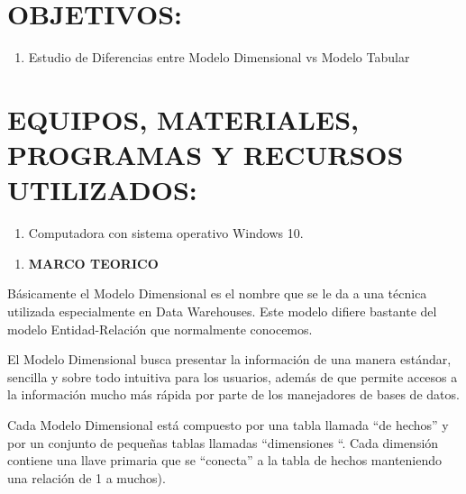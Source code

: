 \documentclass{article} %
\begin{document}
\noindent 

\noindent 
\section{OBJETIVOS:}

\noindent 

\begin{enumerate}
\item  Estudio de Diferencias entre Modelo Dimensional vs Modelo Tabular
\end{enumerate}

\noindent 

\noindent 
\section{EQUIPOS, MATERIALES, PROGRAMAS Y RECURSOS UTILIZADOS:}

\noindent 

\begin{enumerate}
\item  Computadora con sistema operativo Windows 10. 
\end{enumerate}

\noindent 

\begin{enumerate}
\item  \textbf{MARCO TEORICO}
\end{enumerate}

\noindent 

\noindent \textbf{}

\noindent \textbf{\underbar{}}

\noindent B\'{a}sicamente el Modelo Dimensional es el nombre que se le da a una t\'{e}cnica utilizada especialmente en Data Warehouses. Este modelo difiere bastante del modelo Entidad-Relaci\'{o}n que normalmente conocemos.

\noindent 

\noindent El Modelo Dimensional busca presentar la informaci\'{o}n de una manera est\'{a}ndar, sencilla y sobre todo intuitiva para los usuarios, adem\'{a}s de que permite accesos a la informaci\'{o}n mucho m\'{a}s r\'{a}pida por parte de los manejadores de bases de datos.

\noindent 

\noindent Cada Modelo Dimensional est\'{a} compuesto por una tabla llamada ``de hechos'' y por un conjunto de peque\~{n}as tablas llamadas ``dimensiones ``. Cada dimensi\'{o}n contiene una llave primaria que se ``conecta'' a la tabla de hechos manteniendo una relaci\'{o}n de 1 a muchos).
\end{document}
